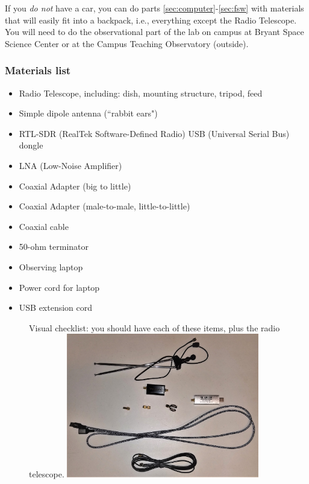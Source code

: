 \documentclass[11pt]{article}
\begin{document}
If you \emph{do not} have a car, you can do parts \ref{sec:computer}-\ref{sec:fsw}
with materials that will easily fit into a backpack, i.e., everything except the Radio Telescope.
You will need to do the observational part of the lab on campus at Bryant Space Science Center or at
the Campus Teaching Observatory (outside).



\clearpage
\subsubsection{Materials list}
\begin{itemize}
    \item Radio Telescope, including: dish, mounting structure, tripod, feed
    \item Simple dipole antenna (``rabbit ears")
    \item RTL-SDR (RealTek Software-Defined Radio) USB (Universal Serial Bus) dongle
    \item LNA (Low-Noise Amplifier)
    \item Coaxial Adapter (big to little)
    \item Coaxial Adapter (male-to-male, little-to-little)
    \item Coaxial cable
    \item 50-ohm terminator
    \item Observing laptop
    \item Power cord for laptop
    \item USB extension cord
\end{itemize}
\begin{figure}[h]
    \centering
    Visual checklist: you should have each of these items, plus the radio telescope.
    \includegraphics[width=0.75\textwidth]{RadioLabPhotos/radiolab_equipment.jpg}
\end{figure}
\end{document}
